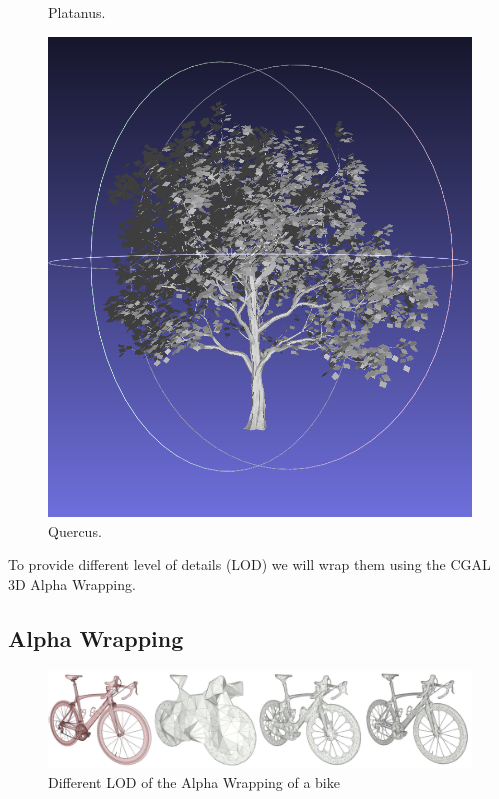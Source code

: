 \documentclass[12pt]{article}
\begin{document}
\begin{figure}[H]
\begin{minipage}{0.24\textwidth}
        \caption{Platanus.}
    \end{minipage}\hfill
    \begin{minipage}{0.24\textwidth}
        \centering
        \includegraphics[width=\textwidth]{images/quercus.png}
        \caption{Quercus.}
    \end{minipage}
\end{figure}

To provide different level of details (LOD) we will wrap them using the
CGAL 3D Alpha Wrapping\cite{cgal_alpha_wrapper}.

\subsection{Alpha Wrapping}
\begin{figure}[H]
    \centering
        \centering
        \includegraphics[width=\textwidth]{images/aw3_bike_lod.jpg}
        \caption{Different LOD of the Alpha Wrapping of a bike}
\end{figure}
\end{document}
